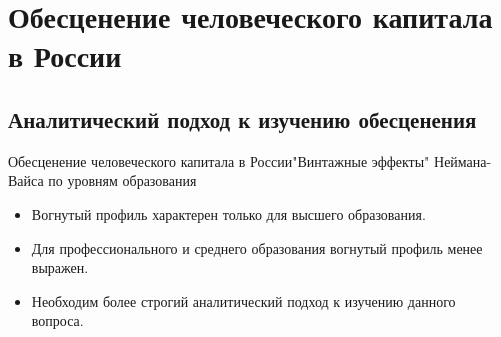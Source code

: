 \documentclass{beamer}
\begin{document}
\section{Обесценение человеческого капитала в России}
\subsection{Аналитический подход к изучению обесценения}

\begin{frame}{Обесценение человеческого капитала в России}{"Винтажные эффекты" Неймана-Вайса по уровням образования}
\begin{figure}
	\centering
	\hfill
	\hfill
\end{figure}
\fontsize{8}{10}\selectfont
\begin{itemize}
	\item Вогнутый профиль характерен только для высшего образования. 
	\item Для профессионального и среднего образования вогнутый профиль менее выражен.
	\item Необходим более строгий аналитический подход к изучению данного вопроса.
\end{itemize}
\end{frame}
\end{document}

